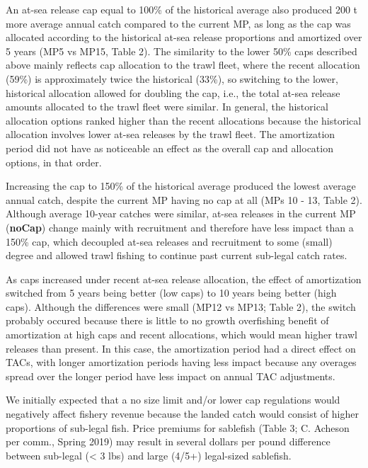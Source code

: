 \documentclass[11pt]{book}
\begin{document}
An at-sea release cap equal to 100\% of the historical average also produced 200 t more average annual catch compared to the current MP, as long as the cap was allocated according to the historical at-sea release proportions and amortized over 5 years (MP5 vs MP15, Table 2). The similarity to the lower 50\% caps described above mainly reflects cap allocation to the trawl fleet, where the recent allocation (59\%) is approximately twice the historical (33\%), so switching to the lower, historical allocation allowed for doubling the cap, i.e., the total at-sea release amounts allocated to the trawl fleet were similar. In general, the historical allocation options ranked higher than the recent allocations because the historical allocation involves lower at-sea releases by the trawl fleet. The amortization period did not have as noticeable an effect as the overall cap and allocation options, in that order.

Increasing the cap to 150\% of the historical average produced the lowest average annual catch, despite the current MP having no cap at all (MPs 10 - 13, Table 2). Although average 10-year catches were similar, at-sea releases in the current MP (\textbf{noCap}) change mainly with recruitment and therefore have less impact than a 150\% cap, which decoupled at-sea releases and recruitment to some (small) degree and allowed trawl fishing to continue past current sub-legal catch rates.

As caps increased under recent at-sea release allocation, the effect of amortization switched from 5 years being better (low caps) to 10 years being better (high caps). Although the differences were small (MP12 vs MP13; Table 2), the switch probably occured because there is little to no growth overfishing benefit of amortization at high caps and recent allocations, which would mean higher trawl releases than present. In this case, the amortization period had a direct effect on TACs, with longer amortization periods having less impact because any overages spread over the longer period have less impact on annual TAC adjustments.

We initially expected that a no size limit and/or lower cap regulations would negatively affect fishery revenue because the landed catch would consist of higher proportions of sub-legal fish. Price premiums for sablefish (Table 3; C. Acheson per comm., Spring 2019) may result in several dollars per pound difference between sub-legal (\textless{} 3 lbs) and large (4/5+) legal-sized sablefish.
\end{document}
